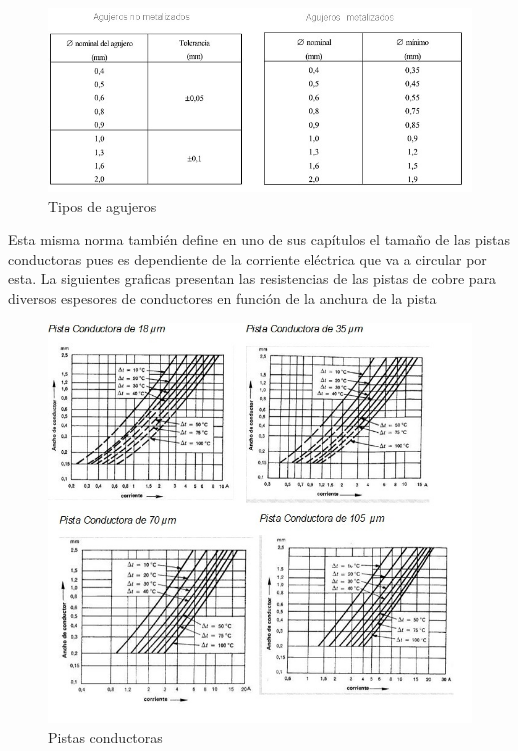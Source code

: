 \documentclass[a4paper,12pt,twoside]{proyectotanquesecci}
\begin{document}
\begin{figure}[h]
\centering
\includegraphics[scale=0.8]{tabla1.jpg}
\renewcommand{\figurename}{Fig.}
\caption{Tipos de agujeros}
\label{Tipos de agujeros}
\end{figure}

Esta misma norma  también define en uno de sus capítulos  el tamaño de las pistas conductoras pues es dependiente  de la corriente eléctrica que va a circular por esta. 
La siguientes graficas presentan las resistencias de las pistas de cobre para diversos espesores de conductores  en función de la anchura de la pista

\begin{figure}[h]
\centering
\includegraphics[scale=0.8]{pistas.jpg}
\renewcommand{\figurename}{Fig.}
\caption{Pistas conductoras}
\label{Pistas conductoras}
\end{figure}
\end{document}
